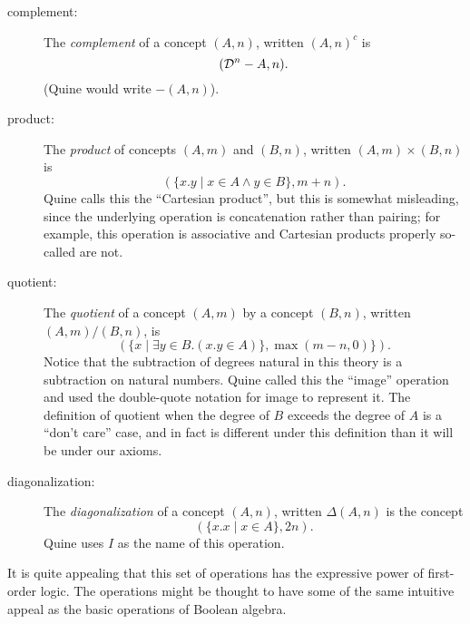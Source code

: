 \begin{description}

\item[complement:] The {\em complement\/} of a concept $(A,n)$,
written $(A,n)^c$ is $$({\cal D}^n-A,n).$$ (Quine would write $-(A,n)$).

\item[product:] The {\em product\/} of concepts $(A,m)$ and $(B,n)$,
written $(A,m)\times (B,n)$ is $$(\{x.y\mid x\in A \wedge y \in
B\},m+n).$$ Quine calls this the ``Cartesian product'', but this is
somewhat misleading, since the underlying operation is concatenation
rather than pairing; for example, this operation is associative and
Cartesian products properly so-called are not.

\item[quotient:] The {\em quotient\/} of a concept $(A,m)$ by a
concept $(B,n)$, written $(A,m)/(B,n)$, is $$(\{x \mid \exists y \in
B. (x.y \in A)\},\max(m-n,0)\}).$$  Notice that the subtraction of
degrees natural in this theory is a subtraction on natural numbers.
Quine called this the ``image'' operation and used the double-quote
notation for image to represent it.  The definition of quotient when
the degree of $B$ exceeds the degree of $A$ is a ``don't care'' case,
and in fact is different under this definition than it will be under
our axioms.

\item[diagonalization:] The {\em diagonalization\/} of a concept
$(A,n)$, written $\Delta(A,n)$ is the concept $$(\{x.x\mid x \in
A\},2n).$$  Quine uses $I$ as the name of this operation.
\end{description}

It is quite appealing that this set of operations has the expressive
power of first-order logic.  The operations might be thought to have
some of the same intuitive appeal as the basic operations of Boolean
algebra.

